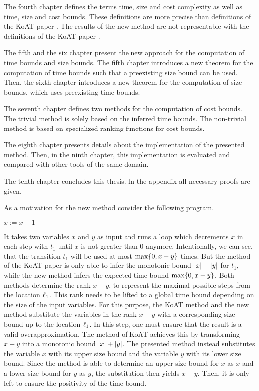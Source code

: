 The fourth chapter defines the terms time, size and cost complexity as well as time, size and cost bounds.
These definitions are more precise than definitions of the KoAT paper \cite{koat}.
The results of the new method are not representable with the definitions of the KoAT paper \cite{koat}.

The fifth and the six chapter present the new approach for the computation of time bounds and size bounds.
The fifth chapter introduces a new theorem for the computation of time bounds such that a preexisting size bound can be used.
Then, the sixth chapter introduces a new theorem for the computation of size bounds, which uses preexisting time bounds.

The seventh chapter defines two methods for the computation of cost bounds.
The trivial method is solely based on the inferred time bounds.
The non-trivial method is based on specialized ranking functions for cost bounds.

The eighth chapter presents details about the implementation of the presented method.
Then, in the ninth chapter, this implementation is evaluated and compared with other tools of the same domain.

The tenth chapter concludes this thesis.
In the appendix all necessary proofs are given.

As a motivation for the new method consider the following program.

\begin{algorithmic}
    \State $x := x - 1$
  \EndWhile
\end{algorithmic}

It takes two variables $x$ and $y$ as input and runs a loop which decrements $x$ in each step with $t_1$ until $x$ is not greater than 0 anymore.
Intentionally, we can see, that the transition $t_1$ will be used at most $\max \lbrace 0, x-y \rbrace$ times.
But the method of the KoAT paper \cite{koat} is only able to infer the monotonic bound $\left|x\right|+\left|y\right|$ for $t_1$, while the new method infers the expected time bound $\max \lbrace 0, x-y \rbrace$.
Both methods determine the rank $x-y$, to represent the maximal possible steps from the location $\ell_1$.
This rank needs to be lifted to a global time bound depending on the size of the input variables.
For this purpose, the KoAT method \cite{koat} and the new method substitute the variables in the rank $x-y$ with a corresponding size bound up to the location $\ell_1$.
In this step, one must ensure that the result is a valid overapproximation.
The method of KoAT \cite{koat} achieves this by transforming $x-y$ into a monotonic bound $\left|x\right|+\left|y\right|$.
The presented method instead substitutes the variable $x$ with its upper size bound and the variable $y$ with its lower size bound.
Since the method is able to determine an upper size bound for $x$ as $x$ and a lower size bound for $y$ as $y$, the substitution then yields $x-y$.
Then, it is only left to ensure the positivity of the time bound.
